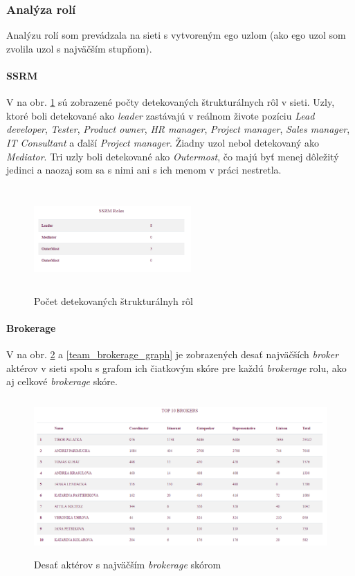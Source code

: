 \documentclass[slovak,master,public,dept460,male,cpdeclaration,oneside]{diploma}
\begin{document}
\subsubsection{Analýza rolí}

Analýzu rolí som prevádzala na sieti s vytvoreným ego uzlom (ako ego uzol som zvolila uzol s najväčším stupňom). 

\paragraph{SSRM}
\hfill \break
V na obr. \ref{team_ssrm} sú zobrazené počty detekovaných štrukturálnych rôl v sieti. Uzly, ktoré boli detekované ako \textit{leader} zastávajú v reálnom živote pozíciu \textit{Lead developer}, \textit{Tester}, \textit{Product owner}, \textit{HR manager}, \textit{Project manager}, \textit{Sales manager}, \textit{IT Consultant} a ďalší \textit{Project manager}. Žiadny uzol nebol detekovaný ako \textit{Mediator}. Tri uzly boli detekované ako \textit{Outermost}, čo majú byť menej dôležitý jedinci a naozaj som sa s nimi ani s ich menom v práci nestretla.

\begin{figure}[H]
\centering
\includegraphics[width=6cm, height=4cm]{figures/team_ssrm}
\caption{Počet detekovaných štrukturálnyh rôl}
\label{team_ssrm}
\end{figure}


\paragraph{Brokerage}
\hfill \break
V na obr. \ref{team_brokerage_tab} a \ref{team_brokerage_graph} je zobrazených desať najväčších \textit{broker} aktérov v sieti spolu s grafom ich čiatkovým skóre pre každú \textit{brokerage} rolu, ako aj celkové \textit{brokerage} skóre.


\begin{figure}[H]
\centering
\includegraphics[width=15cm, height=6cm]{figures/team_brokerage_tab}
\caption{Desať aktérov s najväčším \textit{brokerage} skórom}
\label{team_brokerage_tab}
\end{figure}
\end{document}
